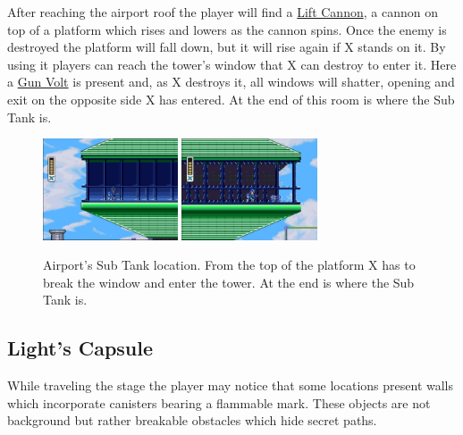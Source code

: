 After reaching the airport roof the player will find a 	\hyperlink{enem:Lift_Cannon}{Lift Cannon}, a cannon on top of a platform which rises and lowers as the cannon spins. Once the enemy is destroyed the platform will fall down, but it will rise again if X stands on it. By using it players can reach the tower's window that X can destroy to enter it. Here a \hyperlink{enem:Gun_Volt}{Gun Volt} is present and, as X destroys it, all windows will shatter, opening and exit on the opposite side X has entered. At the end of this room is where the Sub Tank is. 
\begin{figure}[htp]
	\centering
		\includegraphics[height=3cm]{figures/X1/Storm_eagle/Storm_tank_1.jpg}
		\includegraphics[height=3cm]{figures/X1/Storm_eagle/Storm_tank_2.jpg}
	\caption{Airport's Sub Tank location. From the top of the platform X has to break the window and enter the tower. At the end is where the Sub Tank is.}
\end{figure}

\subsection{Light's Capsule} 

While traveling the stage the player may notice that some locations present walls which incorporate canisters bearing a flammable mark. These objects are not background but rather breakable obstacles which hide secret paths. 

